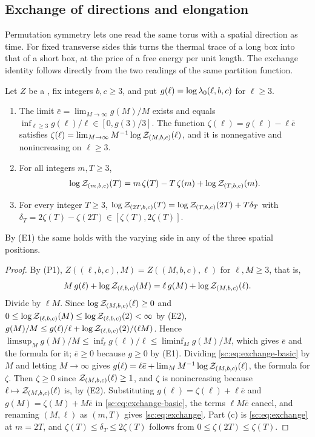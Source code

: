 \subsection{Exchange of directions and elongation}

Permutation symmetry lets one read the same torus with a spatial direction as time. For fixed transverse sides this turns the thermal trace of a long box into that of a short box, at the price of a free energy per unit length. The exchange identity follows directly from the two readings of the same partition function.

\begin{lemma}\label{sc:lem:exchange}
Let $Z$ be a \PSTS{}, fix integers $b,c\ge3$, and put $g(\ell)=\log\lambda_0(\ell,b,c)$ for $\ell\ge3$.
\begin{enumerate}[label=(\alph*)]
\item The limit $\bar e=\lim_{M\to\infty}g(M)/M$ exists and equals $\inf_{\ell\ge3}g(\ell)/\ell\in[0,g(3)/3]$. The function $\zeta(\ell)=g(\ell)-\ell\bar e$ satisfies $\zeta(\ell)=\lim_{M\to\infty}M^{-1}\log\mathcal Z_{(M,b,c)}(\ell)$, and it is nonnegative and nonincreasing on $\ell\ge3$.
\item For all integers $m,T\ge3$,
\begin{equation}\label{sc:eq:exchange}
\log\mathcal Z_{(m,b,c)}(T)=m\,\zeta(T)-T\,\zeta(m)+\log\mathcal Z_{(T,b,c)}(m).
\end{equation}
\item For every integer $T\ge3$, $\log\mathcal Z_{(2T,b,c)}(T)=\log\mathcal Z_{(T,b,c)}(2T)+T\delta_T$ with $\delta_T=2\zeta(T)-\zeta(2T)\in[\zeta(T),2\zeta(T)]$.
\end{enumerate}
By (E1) the same holds with the varying side in any of the three spatial positions.
\end{lemma}

\begin{proof}
By (P1), $Z((\ell,b,c),M)=Z((M,b,c),\ell)$ for $\ell,M\ge3$, that is,
\begin{equation}\label{sc:eq:exchange-basic}
M\,g(\ell)+\log\mathcal Z_{(\ell,b,c)}(M)=\ell\,g(M)+\log\mathcal Z_{(M,b,c)}(\ell).
\end{equation}
Divide by $\ell M$. Since $\log\mathcal Z_{(M,b,c)}(\ell)\ge0$ and $0\le\log\mathcal Z_{(\ell,b,c)}(M)\le\log\mathcal Z_{(\ell,b,c)}(2)<\infty$ by (E2), $g(M)/M\le g(\ell)/\ell+\log\mathcal Z_{(\ell,b,c)}(2)/(\ell M)$. Hence $\limsup_Mg(M)/M\le\inf_\ell g(\ell)/\ell\le\liminf_Mg(M)/M$, which gives $\bar e$ and the formula for it; $\bar e\ge0$ because $g\ge0$ by (E1). Dividing \eqref{sc:eq:exchange-basic} by $M$ and letting $M\to\infty$ gives $g(\ell)=\ell\bar e+\lim_MM^{-1}\log\mathcal Z_{(M,b,c)}(\ell)$, the formula for $\zeta$. Then $\zeta\ge0$ since $\mathcal Z_{(M,b,c)}(\ell)\ge1$, and $\zeta$ is nonincreasing because $\ell\mapsto\mathcal Z_{(M,b,c)}(\ell)$ is, by (E2). Substituting $g(\ell)=\zeta(\ell)+\ell\bar e$ and $g(M)=\zeta(M)+M\bar e$ in \eqref{sc:eq:exchange-basic}, the terms $\ell M\bar e$ cancel, and renaming $(M,\ell)$ as $(m,T)$ gives \eqref{sc:eq:exchange}. Part (c) is \eqref{sc:eq:exchange} at $m=2T$, and $\zeta(T)\le\delta_T\le2\zeta(T)$ follows from $0\le\zeta(2T)\le\zeta(T)$.
\end{proof}

